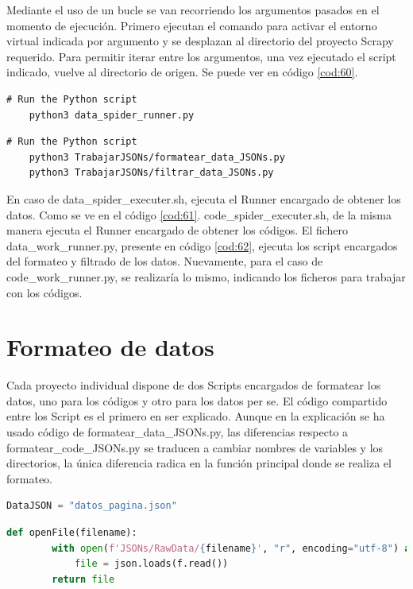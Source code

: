 Mediante el uso de un bucle se van recorriendo los argumentos pasados en el momento de ejecución. Primero ejecutan el comando para activar el entorno virtual indicada por argumento y se desplazan al directorio del proyecto Scrapy requerido. Para permitir iterar entre los argumentos, una vez ejecutado el script indicado, vuelve al directorio de origen. Se puede ver en código \ref{cod:60}.

\begin{lstlisting}[caption={Ejecución de data\_spider\_runner.py}, label=cod:61]
	# Run the Python script
	python3 data_spider_runner.py
\end{lstlisting}

\begin{lstlisting}[caption={Ejecución de data\_work\_runner.py}, label=cod:62]
	# Run the Python script
	python3 TrabajarJSONs/formatear_data_JSONs.py
	python3 TrabajarJSONs/filtrar_data_JSONs.py
\end{lstlisting}

En caso de data\_spider\_executer.sh, ejecuta el Runner encargado de obtener los datos. Como se ve en el código \ref{cod:61}. code\_spider\_executer.sh, de la misma manera ejecuta el Runner encargado de obtener los códigos. El fichero data\_work\_runner.py, presente en código \ref{cod:62}, ejecuta los script encargados del formateo y filtrado de los datos. Nuevamente, para el caso de code\_work\_runner.py, se realizaría lo mismo, indicando los ficheros para trabajar con los códigos. 

\section{Formateo de datos}
Cada proyecto individual dispone de dos Scripts encargados de formatear los datos, uno para los códigos y otro para los datos per se. El código compartido entre los Script es el primero en ser explicado. Aunque en la explicación se ha usado código de formatear\_data\_JSONs.py, las diferencias respecto a formatear\_code\_JSONs.py se traducen a cambiar nombres de variables y los directorios, la única diferencia radica en la función principal donde se realiza el formateo.

\begin{lstlisting}[language=Python, caption={Declaración variable del JSON que se desea usar}, label=cod:63]
	DataJSON = "datos_pagina.json"
\end{lstlisting}

\begin{lstlisting}[language=Python, caption={Declaración función \textit{openFile()}}, label=cod:64]
	def openFile(filename):
		with open(f'JSONs/RawData/{filename}', "r", encoding="utf-8") as f:
			file = json.loads(f.read())
		return file
\end{lstlisting}

